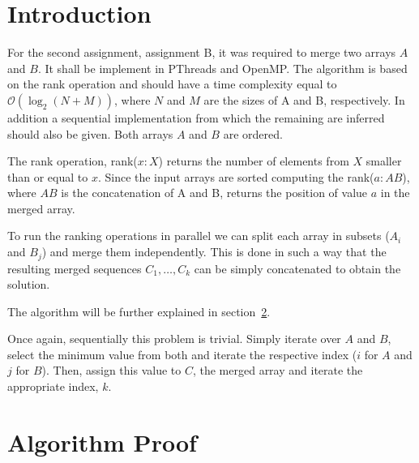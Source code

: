 \renewcommand{\O}{\mathcal{O}}


\section{Introduction}

For the second assignment, assignment B,  it was required to merge two arrays $A$ and $B$. It shall be implement in PThreads and OpenMP. The algorithm is based on the rank operation and should have a time complexity equal to $\O(\log_2(N + M))$, where $N$ and $M$ are the sizes of A and B, respectively. In addition a sequential implementation from which the remaining are inferred should also be given. Both arrays $A$ and $B$ are ordered.

The rank operation, rank($x : X$) returns the number of elements from $X$ smaller than or equal to $x$. Since the input arrays are sorted computing the rank($a : AB$), where $AB$ is the concatenation of A and B, returns the position of value $a$ in the merged array.

To run the ranking operations in parallel we can split each array in subsets ($A_i$ and $B_j$) and merge them independently. This is done in such a way that the resulting merged sequences $C_1, \dots, C_k$ can be simply concatenated to obtain the solution.

The algorithm will be further explained in section~\ref{sec:proof}.

Once again, sequentially this problem is trivial. Simply iterate over $A$ and $B$, select the minimum value from both and iterate the respective index ($i$ for $A$ and $j$ for $B$). Then, assign this value to $C$, the merged array and iterate the appropriate index, $k$.

\section{Algorithm Proof}
\label{sec:proof}


